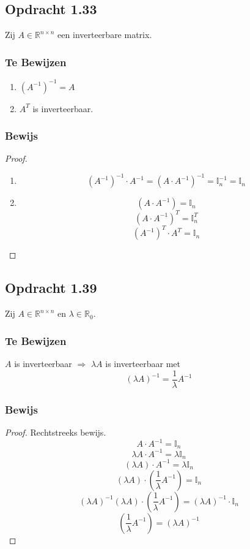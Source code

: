 \documentclass[lineaire_algebra_oplossingen.tex]{subfiles}
\begin{document}
\subsection{Opdracht 1.33}
\label{1.33}
Zij $A \in \mathbb{R}^{n\times n}$ een inverteerbare matrix.

\subsubsection*{Te Bewijzen}
\begin{enumerate}
\item $(A^{-1})^{-1} = A$
\item $A^T$ is inverteerbaar.
\end{enumerate}

\subsubsection*{Bewijs}
\begin{proof}
\begin{enumerate}
\item
\[
(A^{-1})^{-1}\cdot A^{-1} = (A \cdot A^{-1})^{-1} = \mathbb{I}_n^{-1} = \mathbb{I}_n
\]

\item
\[
(A\cdot A^{-1}) = \mathbb{I}_n
\]
\[
(A\cdot A^{-1})^T = \mathbb{I}_n^T
\]
\[
(A^{-1})^T \cdot A^T= \mathbb{I}_n
\]
\end{enumerate}
\end{proof}


\subsection{Opdracht 1.39}
\label{1.39}
Zij $A\in \mathbb{R}^{n\times n}$ en $\lambda \in \mathbb{R}_0$.
\subsubsection*{Te Bewijzen}
$A$ is inverteerbaar $\Rightarrow$ $\lambda A$ is inverteerbaar met 
\[
(\lambda A)^{-1} = \frac{1}{\lambda}A^{-1}
\]

\subsubsection*{Bewijs}
\begin{proof}
Rechtstreeks bewijs.\\
\[
A\cdot A^{-1} = \mathbb{I}_n
\]
\[
\lambda A\cdot A^{-1} = \lambda\mathbb{I}_n
\]
\[
(\lambda A)\cdot A^{-1} = \lambda\mathbb{I}_n
\]
\[
(\lambda A)\cdot (\frac{1}{\lambda}A^{-1}) = \mathbb{I}_n
\]
$$(\lambda A)^{-1}(\lambda A)\cdot (\frac{1}{\lambda}A^{-1}) = (\lambda A)^{-1} \cdot \mathbb{I}_n$$
$$(\frac{1}{\lambda}A^{-1}) = (\lambda A)^{-1}$$
\end{proof}
\end{document}
